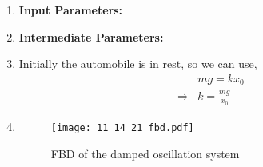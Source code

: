 \documentclass[journal,12pt,twocolumn]{IEEEtran}
\theoremstyle{remark}
\begin{document}
\begin{enumerate}
\item \textbf{Input Parameters:}
\begin{table}[h]
    
    \label{Table-1}
\end{table}
\item \textbf{Intermediate Parameters:}
\begin{table}[h]

\label{Table-2}
\end{table}

\item{}
    Initially the automobile is in rest, so we can use,
    \begin{align}
&mg = kx_0 \label{1}\\
\Rightarrow &k=\frac{mg}{x_0} \label{2}
    \end{align}

\item{}
\begin{figure}[h]
        \centering
        \texttt{[image: 11\_14\_21\_fbd.pdf]}
        \caption{FBD of the damped oscillation system}
        \label{Fig-1}
    \end{figure}


\end{enumerate}
\end{document}

